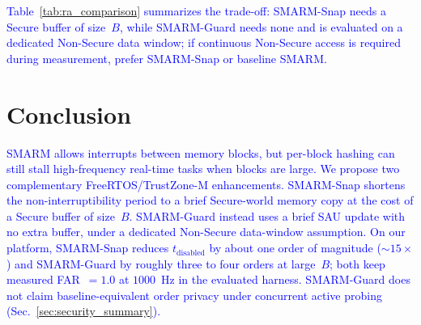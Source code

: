 \documentclass[conference]{IEEEtran}
\newcommand{\tdis}{$t_{\mathrm{disabled}}$\xspace}
\newcommand{\smarmcopy}{SMARM-Snap\xspace}
\newcommand{\smarmlock}{SMARM-Guard\xspace}
\newcommand\ben[1]{\textcolor{blue}{#1}}
\begin{document}
\ben{Table~\ref{tab:ra_comparison} summarizes the trade-off: \smarmcopy{} needs a Secure buffer of size~$B$, while \smarmlock{} needs none and is evaluated on a dedicated Non-Secure data window; if continuous Non-Secure access is required during measurement, prefer \smarmcopy{} or baseline SMARM.}

\section{Conclusion}
\label{sec:conclusion}
\ben{SMARM allows interrupts between memory blocks, but per-block hashing can still stall high-frequency real-time tasks when blocks are large. We propose two complementary FreeRTOS/TrustZone-M enhancements. \smarmcopy{} shortens the non-interruptibility period to a brief Secure-world memory copy at the cost of a Secure buffer of size~$B$. \smarmlock{} instead uses a brief SAU update with no extra buffer, under a dedicated Non-Secure data-window assumption. On our platform, \smarmcopy{} reduces \tdis{} by about one order of magnitude ($\sim\!\!15\times$) and \smarmlock{} by roughly three to four orders at large~$B$; both keep measured FAR~$=1.0$ at $1000$~Hz in the evaluated harness. \smarmlock{} does not claim baseline-equivalent order privacy under concurrent active probing (Sec.~\ref{sec:security_summary}).}



{\footnotesize


}
\end{document}
